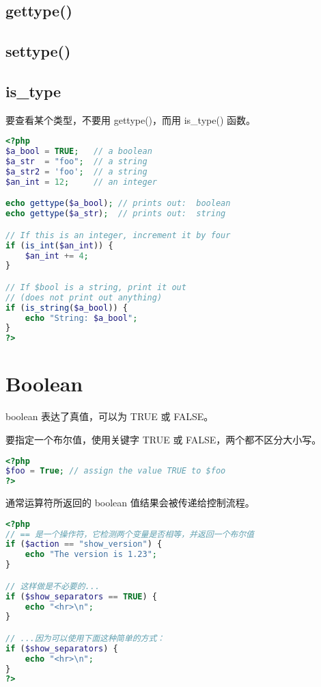 \subsection{gettype()}


\subsection{settype()}



\subsection{is\_type}


要查看某个类型，不要用 gettype()，而用 is\_type() 函数。

\begin{lstlisting}[language=PHP]
<?php
$a_bool = TRUE;   // a boolean
$a_str  = "foo";  // a string
$a_str2 = 'foo';  // a string
$an_int = 12;     // an integer

echo gettype($a_bool); // prints out:  boolean
echo gettype($a_str);  // prints out:  string

// If this is an integer, increment it by four
if (is_int($an_int)) {
    $an_int += 4;
}

// If $bool is a string, print it out
// (does not print out anything)
if (is_string($a_bool)) {
    echo "String: $a_bool";
}
?>
\end{lstlisting}





\section{Boolean}

boolean 表达了真值，可以为 TRUE 或 FALSE。

要指定一个布尔值，使用关键字 TRUE 或 FALSE，两个都不区分大小写。

\begin{lstlisting}[language=PHP]
<?php
$foo = True; // assign the value TRUE to $foo
?>
\end{lstlisting}

通常运算符所返回的 boolean 值结果会被传递给控制流程。

\begin{lstlisting}[language=PHP]
<?php
// == 是一个操作符，它检测两个变量是否相等，并返回一个布尔值
if ($action == "show_version") {
    echo "The version is 1.23";
}

// 这样做是不必要的...
if ($show_separators == TRUE) {
    echo "<hr>\n";
}

// ...因为可以使用下面这种简单的方式：
if ($show_separators) {
    echo "<hr>\n";
}
?>
\end{lstlisting}

